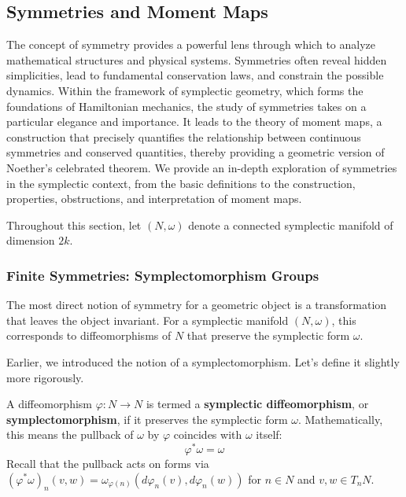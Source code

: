 \subsection{Symmetries and Moment Maps}


The concept of symmetry provides a powerful lens through which to analyze mathematical structures and physical systems. Symmetries often reveal hidden simplicities, lead to fundamental conservation laws, and constrain the possible dynamics. Within the framework of symplectic geometry, which forms the foundations of Hamiltonian mechanics, the study of symmetries takes on a particular elegance and importance. It leads to the theory of moment maps, a construction that precisely quantifies the relationship between continuous symmetries and conserved quantities, thereby providing a geometric version of Noether's celebrated theorem. We provide an in-depth exploration of symmetries in the symplectic context, from the basic definitions to the construction, properties, obstructions, and interpretation of moment maps.

Throughout this section, let $(N, \omega)$ denote a connected symplectic manifold of dimension $2k$.

\subsubsection{Finite Symmetries: Symplectomorphism Groups}

The most direct notion of symmetry for a geometric object is a transformation that leaves the object invariant. For a symplectic manifold $(N, \omega)$, this corresponds to diffeomorphisms of $N$ that preserve the symplectic form $\omega$.

Earlier, we introduced the notion of a symplectomorphism. Let's define it slightly more rigorously.

\begin{definition}[Symplectomorphism]
A diffeomorphism $\varphi: N \to N$ is termed a \textbf{symplectic diffeomorphism}, or \textbf{symplectomorphism}, if it preserves the symplectic form $\omega$. Mathematically, this means the pullback of $\omega$ by $\varphi$ coincides with $\omega$ itself:
\[ \varphi^* \omega = \omega \]
Recall that the pullback acts on forms via $(\varphi^* \omega)_n(v, w) = \omega_{\varphi(n)}(d\varphi_n(v), d\varphi_n(w))$ for $n \in N$ and $v, w \in T_n N$.
\end{definition}

